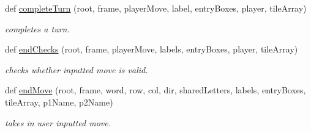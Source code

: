 \begin{DoxyCompactItemize}
def \hyperlink{classgame_controller_1_1back_end_a6f97fb6a72fa3af35d57bdb505656d65}{complete\+Turn} (root, frame, player\+Move, label, entry\+Boxes, player, tile\+Array)
\begin{DoxyCompactList}\small\item\em completes a turn. \end{DoxyCompactList}\item 
def \hyperlink{classgame_controller_1_1back_end_a650a75e35e8020a699462d7ae57c4874}{end\+Checks} (root, frame, player\+Move, labels, entry\+Boxes, player, tile\+Array)
\begin{DoxyCompactList}\small\item\em checks whether inputted move is valid. \end{DoxyCompactList}\item 
def \hyperlink{classgame_controller_1_1back_end_ad722a8ae3b194fb3621d43a8718d02e8}{end\+Move} (root, frame, word, row, col, dir, shared\+Letters, labels, entry\+Boxes, tile\+Array, p1\+Name, p2\+Name)
\begin{DoxyCompactList}\small\item\em takes in user inputted move. \end{DoxyCompactList}\end{DoxyCompactItemize}
